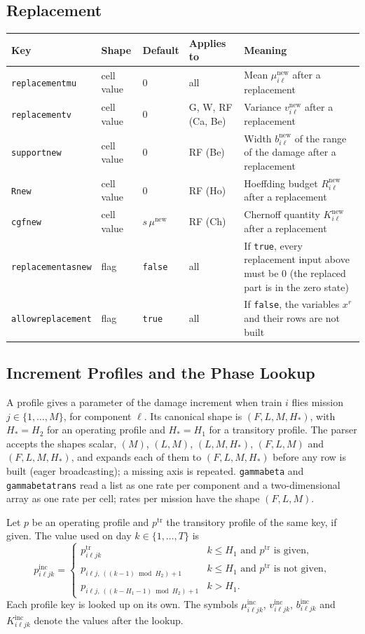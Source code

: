 \documentclass[11pt,a4paper]{article}
\makeatletter
\theoremstyle{plain}
\theoremstyle{definition}
\newcommand{\inc}{\mathrm{inc}}
\newcommand{\new}{\mathrm{new}}
\newcommand{\tr}{\mathrm{tr}}
\renewcommand{\_}{\textunderscore\allowbreak{}}
\providecommand{\keyrow}[5]{{\raggedright #1\par} & {\raggedright #2\par} & {\raggedright #3\par} & {\raggedright #4\par} & {\raggedright #5\par} \\}
\providecommand{\tabstart}[2]{\begingroup\small\begin{longtable}{@{}#1@{}}\toprule #2 \\ \midrule \endhead}
\providecommand{\tabend}{\bottomrule\end{longtable}\endgroup}
\providecommand{\keytab}{\tabstart{p{3.2cm}p{2.2cm}p{1.8cm}p{1.9cm}p{4.5cm}}{Key & Shape & Default & Applies to & Meaning}}
\makeatother
\begin{document}
\subsection{Replacement}\label{sec:input_replacement}

\keytab
\keyrow{\texttt{replacement\_mu}}{cell value}{$0$}{all}{Mean $\mu^{\new}_{i\ell}$ after a replacement}
\keyrow{\texttt{replacement\_v}}{cell value}{$0$}{G, W, RF (Ca, Be)}{Variance $v^{\new}_{i\ell}$ after a replacement}
\keyrow{\texttt{support\_new}}{cell value}{$0$}{RF (Be)}{Width $b^{\new}_{i\ell}$ of the range of the damage after a replacement}
\keyrow{\texttt{R\_new}}{cell value}{$0$}{RF (Ho)}{Hoeffding budget $R^{\new}_{i\ell}$ after a replacement}
\keyrow{\texttt{cgf\_new}}{cell value}{$s\,\mu^{\new}$}{RF (Ch)}{Chernoff quantity $K^{\new}_{i\ell}$ after a replacement}
\keyrow{\texttt{replacement\_as\_new}}{flag}{\texttt{false}}{all}{If \texttt{true}, every replacement input above must be $0$ (the replaced part is in the zero state)}
\keyrow{\texttt{allow\_replacement}}{flag}{\texttt{true}}{all}{If \texttt{false}, the variables $x^r$ and their rows are not built}
\tabend

\subsection{Increment Profiles and the Phase Lookup}\label{sec:input_increments}

A profile gives a parameter of the damage increment when train $i$ flies mission $j \in \{1,\ldots,M\}$, for component $\ell$.
Its canonical shape is $(F, L, M, H_*)$, with $H_* = H_2$ for an operating profile and $H_* = H_1$ for a transitory profile.
The parser accepts the shapes scalar, $(M)$, $(L, M)$, $(L, M, H_*)$, $(F, L, M)$ and $(F, L, M, H_*)$, and expands each of them to $(F, L, M, H_*)$ before any row is built (eager broadcasting); a missing axis is repeated.
\texttt{gamma\_beta} and \texttt{gamma\_beta\_trans} read a list as one rate per component and a two-dimensional array as one rate per cell; rates per mission have the shape $(F, L, M)$.

Let $p$ be an operating profile and $p^{\tr}$ the transitory profile of the same key, if given.
The value used on day $k \in \{1,\ldots,T\}$ is
\begin{equation}\label{eq:c_phase}
p^{\inc}_{i\ell jk} =
\begin{cases}
p^{\tr}_{i\ell jk} & k \le H_1 \text{ and } p^{\tr} \text{ is given},\\[2pt]
p_{i\ell j,\,((k-1) \bmod H_2) + 1} & k \le H_1 \text{ and } p^{\tr} \text{ is not given},\\[2pt]
p_{i\ell j,\,((k-H_1-1) \bmod H_2) + 1} & k > H_1.
\end{cases}
\end{equation}
Each profile key is looked up on its own.
The symbols $\mu^{\inc}_{i\ell jk}$, $v^{\inc}_{i\ell jk}$, $b^{\inc}_{i\ell jk}$ and $K^{\inc}_{i\ell jk}$ denote the values after the lookup.
\end{document}
